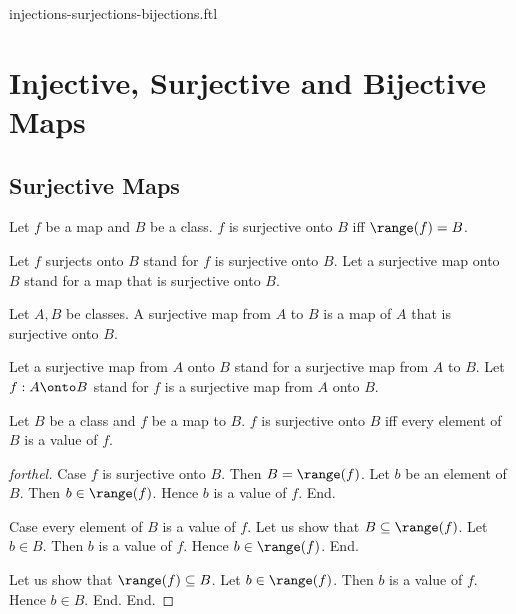 \documentclass{naproche-library}
\begin{document}
\begin{smodule}{injections-surjections-bijections.ftl}


  \section*{Injective, Surjective and Bijective Maps}

  \subsection*{Surjective Maps}

  \begin{definition}[forthel,id=FOUNDATIONS_08_8681187805495296]
    Let $f$ be a map and $B$ be a class.
    $f$ is surjective onto $B$ iff $\range(f) = B$.

    Let $f$ surjects onto $B$ stand for $f$ is surjective onto $B$.
    Let a surjective map onto $B$ stand for a map that is surjective onto $B$.
  \end{definition}

  \begin{definition}[forthel,id=FOUNDATIONS_08_4195237329108992]
    Let $A, B$ be classes.
    A surjective map from $A$ to $B$ is a map of $A$ that is surjective onto $B$.

    Let a surjective map from $A$ onto $B$ stand for a surjective map from $A$ to $B$.
    Let $f: A \onto B$ stand for $f$ is a surjective map from $A$ onto $B$.
  \end{definition}

  \begin{proposition}[forthel,id=FOUNDATIONS_08_1974205941809152]
    Let $B$ be a class and $f$ be a map to $B$.
    $f$ is surjective onto $B$ iff every element of $B$ is a value of $f$.
  \end{proposition}
  \begin{proof}[forthel]
    Case $f$ is surjective onto $B$.
      Then $B = \range(f)$.
      Let $b$ be an element of $B$.
      Then $b \in \range(f)$.
      Hence $b$ is a value of $f$.
    End.

    Case every element of $B$ is a value of $f$.
      Let us show that $B \subseteq \range(f)$.
        Let $b \in B$.
        Then $b$ is a value of $f$.
        Hence $b \in \range(f)$.
      End.

      Let us show that $\range(f) \subseteq B$.
        Let $b \in \range(f)$.
        Then $b$ is a value of $f$.
        Hence $b \in B$.
      End.
    End.
  \end{proof}



\end{smodule}
\end{document}
